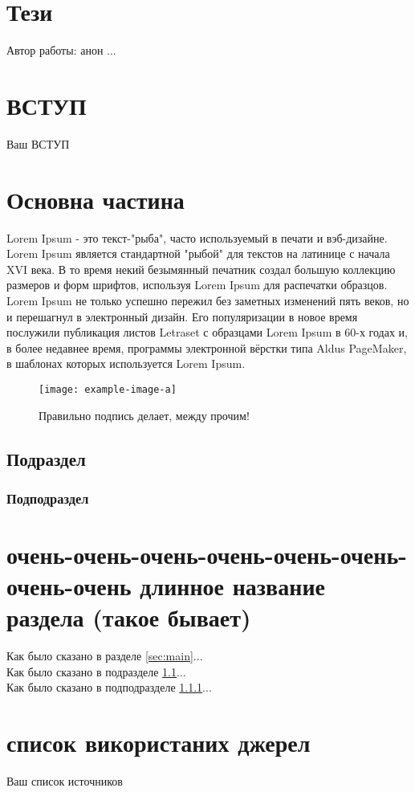 \documentclass[a4paper, 14pt]{article}
\begin{document}
\section*{Т\lowercase{ези}}
Автор работы: анон
...
\newpage
\tableofcontents %
\newpage
\section*{\textbf{ВСТУП}}
Ваш ВСТУП
\newpage %
\section{Основна частина}
Lorem Ipsum - это текст-"рыба", часто используемый в печати и вэб-дизайне. Lorem Ipsum является стандартной "рыбой" для текстов на латинице с начала XVI века. В то время некий безымянный печатник создал большую коллекцию размеров и форм шрифтов, используя Lorem Ipsum для распечатки образцов. Lorem Ipsum не только успешно пережил без заметных изменений пять веков, но и перешагнул в электронный дизайн. Его популяризации в новое время послужили публикация листов Letraset с образцами Lorem Ipsum в 60-х годах и, в более недавнее время, программы электронной вёрстки типа Aldus PageMaker, в шаблонах которых используется Lorem Ipsum.
\begin{figure}[h]
    \centering
    \texttt{[image: example-image-a]}
    \caption{Правильно подпись делает, между прочим!}
    \label{fig:mesh1}
\end{figure} 
\label{sec:main}
\subsection{Подраздел}
\label{subsec:main}
\subsubsection{Подподраздел}
\label{subsubsec:main}
\section{очень-очень-очень-очень-очень-очень-очень-очень длинное название раздела (такое бывает)}
Как было сказано в разделе \ref{sec:main}...\\
Как было сказано в подразделе \ref{subsec:main}...\\
Как было сказано в подподразделе \ref{subsubsec:main}...\\
\section*{список використаних джерел}
Ваш список источников
\end{document}
